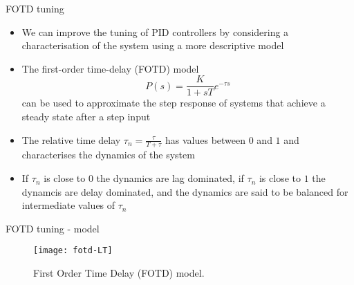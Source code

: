 \documentclass{beamer-control}
\begin{document}
\begin{frame}{FOTD tuning}
	\begin{itemize}
		\item We can improve the tuning of PID controllers by considering a characterisation of the system using a more descriptive model
		\item The first-order time-delay (FOTD) model
		\[P(s) = \frac{K}{1+sT}e^{-\tau s}\]
		can be used to approximate the step response of systems that achieve a steady state after a step input
		\item The relative time delay $\tau_n = \tfrac{\tau}{T+\tau}$
		has values between $0$ and $1$ and characterises the dynamics of the system
		\item If $\tau_n$ is close to $0$ the dynamics are lag dominated, if $\tau_n$ is close to $1$ the dynamcis are delay dominated, and the dynamics are said to be balanced for intermediate values of $\tau_n$
	\end{itemize}
\end{frame}




\begin{frame}{FOTD tuning - model}
\begin{figure}
	\centering
	\texttt{[image: fotd-LT]}
	\caption{First Order Time Delay (FOTD) model.}
\end{figure}
\end{frame}
\end{document}
